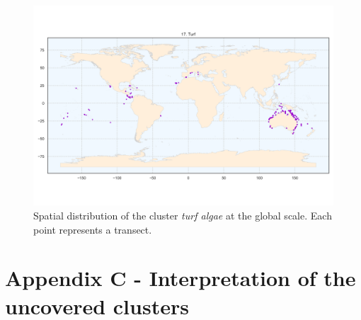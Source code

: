 \begin{figure}
\hypertarget{fig:chap2figS19}{%
\centering
\includegraphics{03-Chapitre2/figures/supplementary/06-spatial-cluster_distribution_cluster_16.png}
\caption{Spatial distribution of the cluster \emph{turf algae} at the
global scale. Each point represents a transect.}\label{fig:chap2figS19}
}
\end{figure}

\clearpage

\hypertarget{appendixC-chapter2}{%
\section*{Appendix C - Interpretation of the uncovered
clusters}\label{appendixC-chapter2}}

